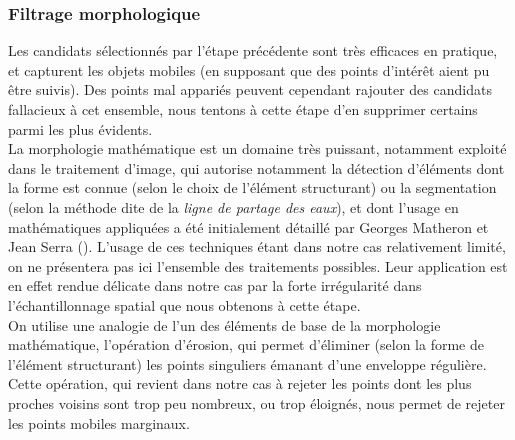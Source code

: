 \subsubsection{Filtrage morphologique}
Les candidats sélectionnés par l'étape précédente sont très efficaces en pratique, et capturent les objets mobiles (en supposant que des points d'intérêt aient pu être suivis). Des points mal appariés peuvent cependant rajouter des candidats fallacieux à cet ensemble, nous tentons à cette étape d'en supprimer certains parmi les plus évidents. \\
La morphologie mathématique est un domaine très puissant, notamment exploité dans le traitement d'image, qui autorise notamment la détection d'éléments dont la forme est connue (selon le choix de l'élément structurant) ou la segmentation (selon la méthode dite de la \emph{ligne de partage des eaux}), et dont l'usage en mathématiques appliquées a été initialement détaillé par Georges Matheron et Jean Serra (\cite{Matheron2002}). L'usage de ces techniques étant dans notre cas relativement limité, on ne présentera pas ici l'ensemble des traitements possibles. Leur application est en effet rendue délicate dans notre cas par la forte irrégularité dans l'échantillonnage spatial que nous obtenons à cette étape.\\

On utilise une analogie de l'un des éléments de base de la morphologie mathématique, l'opération d'érosion, qui permet d'éliminer (selon la forme de l'élément structurant) les points singuliers émanant d'une enveloppe régulière. Cette opération, qui revient dans notre cas à rejeter les points dont les plus proches voisins sont trop peu nombreux, ou trop éloignés, nous permet de rejeter les points mobiles marginaux.

